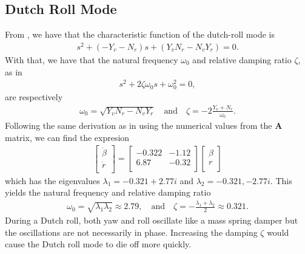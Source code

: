 \subsection{Dutch Roll Mode}
From \cite{beard_mclain_2012}, we have that the characteristic function of the dutch-roll mode is
\begin{equation}\begin{aligned}
s^2 + (-Y_v - N_r)s + (Y_vN_r - N_vY_r) = 0.
\end{aligned}\end{equation}
With that, we have that the natural frequency $\omega_0$ and relative damping ratio $\zeta$, as in
\begin{equation}\begin{aligned}
s^2 + 2\zeta \omega_0 s + \omega_0^2 = 0,
\end{aligned}\end{equation}
are respectively
\begin{equation}\begin{aligned}
\label{eq:freqanddamp}
\omega_0 = \sqrt{Y_v N_r - N_v Y_r} \quad \text{and} \quad \zeta = -2\frac{Y_v + N_r}{\omega_0}.
\end{aligned}\end{equation}
Following the same derivation as in \cite{beard_mclain_2012} using the numerical values from the $\mathbf{A}$ matrix, we can find the expresion
\begin{equation}\begin{aligned}
\begin{bmatrix}
\dot \beta\\
\dot r\\
\end{bmatrix}
=
\begin{bmatrix}
-0.322 & -1.12 \\
6.87 & -0.32 \\
\end{bmatrix}
\begin{bmatrix}
\beta\\
r\\
\end{bmatrix}
\end{aligned}\end{equation}
which has the eigenvalues $\lambda_1 = -0.321 + 2.77i$ and $\lambda_2 = -0.321, - 2.77i$. This yields the natural frequency and relative damping ratio
\begin{equation}\begin{aligned}
\omega_0 = \sqrt{\lambda_1 \lambda_2} \approx 2.79, \quad \text{and} \quad \zeta = -\frac{\lambda_1 + \lambda_2}{2} \approx 0.321.
\end{aligned}\end{equation}
During a Dutch roll, both yaw and roll oscillate like a mass spring damper but the oscillations are not necessarily in phase. Increasing the damping $\zeta$ would cause the Dutch roll mode to die off more quickly.

